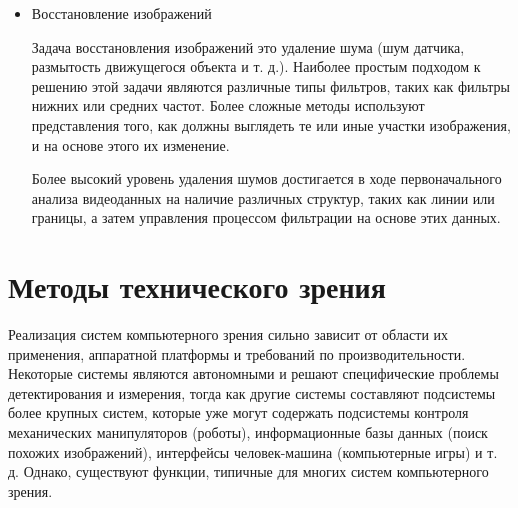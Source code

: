 \documentclass[a4paper,14pt]{extreport}
\begin{document}
\begin{itemize}
	\item Восстановление изображений
	
	Задача восстановления изображений это удаление шума (шум датчика, размытость движущегося объекта и т. д.). Наиболее простым подходом к решению этой задачи являются различные типы фильтров, таких как фильтры нижних или средних частот. Более сложные методы используют представления того, как должны выглядеть те или иные участки изображения, и на основе этого их изменение.
	
	Более высокий уровень удаления шумов достигается в ходе первоначального анализа видеоданных на наличие различных структур, таких как линии или границы, а затем управления процессом фильтрации на основе этих данных.
		
\end{itemize}


\section{Методы технического зрения}

Реализация систем компьютерного зрения сильно зависит от области их применения, аппаратной платформы и требований по производительности. Некоторые системы являются автономными и решают специфические проблемы детектирования и измерения, тогда как другие системы составляют подсистемы более крупных систем, которые уже могут содержать подсистемы контроля механических манипуляторов (роботы), информационные базы данных (поиск похожих изображений), интерфейсы человек-машина (компьютерные игры) и т. д. Однако, существуют функции, типичные для многих систем компьютерного зрения.
\end{document}
